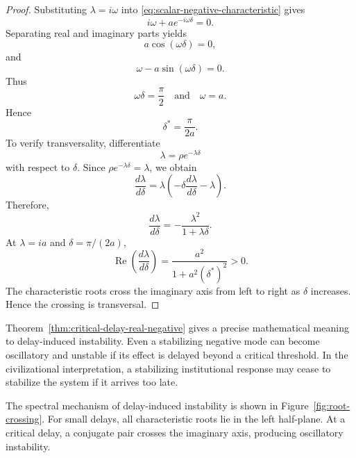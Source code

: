 \documentclass[11pt]{article}
\begin{document}
 \begin{proof}
 	Substituting $\lambda=i\omega$ into
 	\eqref{eq:scalar-negative-characteristic} gives
 	\[
 	i\omega+a e^{-i\omega\delta}=0.
 	\]
 	Separating real and imaginary parts yields
 	\[
 	a\cos(\omega\delta)=0,
 	\]
 	and
 	\[
 	\omega-a\sin(\omega\delta)=0.
 	\]
 	Thus
 	\[
 	\omega\delta=\frac{\pi}{2}
 	\quad
 	\text{and}
 	\quad
 	\omega=a.
 	\]
 	Hence
 	\[
 	\delta^\ast=\frac{\pi}{2a}.
 	\]
 	To verify transversality, differentiate
 	\[
 	\lambda=\rho e^{-\lambda\delta}
 	\]
 	with respect to $\delta$. Since $\rho e^{-\lambda\delta}=\lambda$, we obtain
 	\[
 	\frac{d\lambda}{d\delta}
 	=
 	\lambda
 	\left(
 	-\delta\frac{d\lambda}{d\delta}
 	-\lambda
 	\right).
 	\]
 	Therefore,
 	\[
 	\frac{d\lambda}{d\delta}
 	=
 	-\frac{\lambda^2}{1+\lambda\delta}.
 	\]
 	At $\lambda=ia$ and $\delta=\pi/(2a)$,
 	\[
 	\operatorname{Re}
 	\left(
 	\frac{d\lambda}{d\delta}
 	\right)
 	=
 	\frac{a^2}{1+a^2(\delta^\ast)^2}
 	>0.
 	\]
 	The characteristic roots cross the imaginary axis from left to right as
 	$\delta$ increases. Hence the crossing is transversal.
 \end{proof}
 
 
 	Theorem~\ref{thm:critical-delay-real-negative} gives a precise mathematical
 	meaning to delay-induced instability. Even a stabilizing negative mode can
 	become oscillatory and unstable if its effect is delayed beyond a critical
 	threshold. In the civilizational interpretation, a stabilizing institutional
 	response may cease to stabilize the system if it arrives too late.
 
 
 

 The spectral mechanism of delay-induced instability is shown in
 Figure~\ref{fig:root-crossing}. For small delays, all characteristic roots lie
 in the left half-plane. At a critical delay, a conjugate pair crosses the
 imaginary axis, producing oscillatory instability.
 
\end{document}
